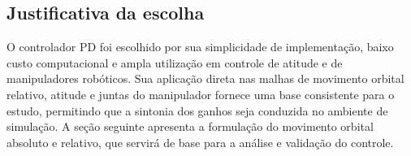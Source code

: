 \subsection{Justificativa da escolha}
O controlador PD foi escolhido por sua simplicidade de implementação, baixo custo computacional e ampla utilização em controle de atitude e de manipuladores robóticos.  
Sua aplicação direta nas malhas de movimento orbital relativo, atitude e juntas do manipulador fornece uma base consistente para o estudo, permitindo que a sintonia dos ganhos seja conduzida no ambiente de simulação.  
A seção seguinte apresenta a formulação do movimento orbital absoluto e relativo, que servirá de base para a análise e validação do controle.